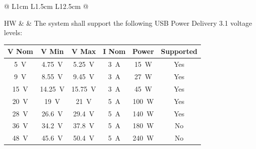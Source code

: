 \begin{longtable}{@{} L{1cm} L{1.5cm} L{12.5cm} @{} }
\headerrow
\addlinespace
\endfirsthead

\headerrow
\addlinespace
\endhead

\addlinespace
{}
\endfoot

\endlastfoot


\addlinespace

\addlinespace

HW &  &
The system shall support the following USB Power Delivery 3.1 voltage levels:

\vspace{0.3cm}

\noindent\begin{tabular}{c c c c c c}
    \toprule
    \textbf{V Nom} &
    \textbf{V Min} &
    \textbf{V Max} &
    \textbf{I Nom} &
    \textbf{Power} &
    \textbf{Supported} \\
    \midrule

    \SI{5}{\volt}  & \SI{4.75}{\volt}  & \SI{5.25}{\volt}  & \SI{3}{\ampere} & \SI{15}{\watt} & Yes \\
    \SI{9}{\volt}  & \SI{8.55}{\volt}  & \SI{9.45}{\volt}  & \SI{3}{\ampere} & \SI{27}{\watt} & Yes \\
    \SI{15}{\volt} & \SI{14.25}{\volt} & \SI{15.75}{\volt} & \SI{3}{\ampere} & \SI{45}{\watt} & Yes \\
    \SI{20}{\volt} & \SI{19}{\volt}    & \SI{21}{\volt}    & \SI{5}{\ampere} & \SI{100}{\watt} & Yes \\
    \SI{28}{\volt} & \SI{26.6}{\volt}  & \SI{29.4}{\volt}  & \SI{5}{\ampere} & \SI{140}{\watt} & Yes \\
    \SI{36}{\volt} & \SI{34.2}{\volt}  & \SI{37.8}{\volt}  & \SI{5}{\ampere} & \SI{180}{\watt} & No \\
    \SI{48}{\volt} & \SI{45.6}{\volt}  & \SI{50.4}{\volt}  & \SI{5}{\ampere} & \SI{240}{\watt} & No \\

\end{tabular}
\\
\midrule


\end{longtable}
